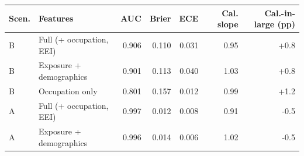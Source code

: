 \begin{tabular}{llrrrrr}
\toprule
Scen. & Features & AUC & Brier & ECE & Cal. slope & Cal.-in-large (pp) \\
\midrule
B & Full (+ occupation, EEI) & 0.906 & 0.110 & 0.031 & 0.95 & +0.8 \\
B & Exposure + demographics & 0.901 & 0.113 & 0.040 & 1.03 & +0.8 \\
B & Occupation only & 0.801 & 0.157 & 0.012 & 0.99 & +1.2 \\
\midrule
A & Full (+ occupation, EEI) & 0.997 & 0.012 & 0.008 & 0.91 & -0.5 \\
A & Exposure + demographics & 0.996 & 0.014 & 0.006 & 1.02 & -0.5 \\
\bottomrule
\end{tabular}
